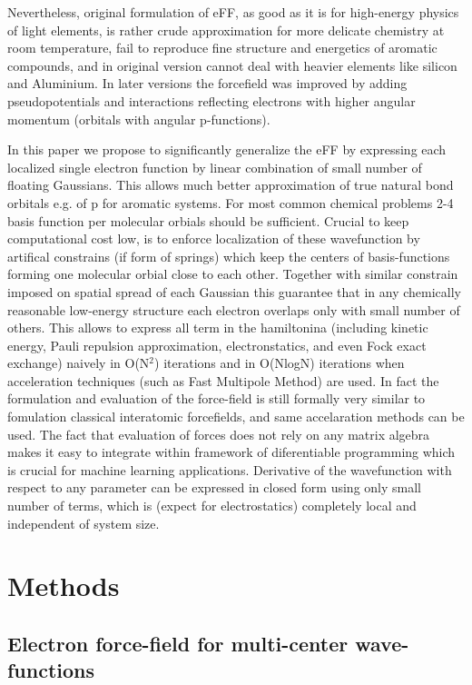 \documentclass[%
 reprint,
 amsmath,amssymb,
prb,
]{revtex4-1}
\begin{document}
Nevertheless, original formulation of eFF, as good as it is for high-energy physics of light elements, is rather crude approximation for more delicate chemistry at room temperature, fail to reproduce fine structure and energetics of aromatic compounds, and in original version cannot deal with heavier elements  like silicon and Aluminium. In later versions the forcefield was improved by adding pseudopotentials and interactions reflecting electrons with higher angular momentum (orbitals with angular p-functions).

In this paper we propose to significantly generalize the eFF by expressing each localized single electron function by linear combination of small number of floating Gaussians. This allows much better approximation of true natural bond orbitals e.g. of p for aromatic systems. For most common chemical problems 2-4 basis function per molecular orbials should be sufficient. Crucial to keep computational cost low, is to enforce localization of these wavefunction by artifical constrains (if form of springs) which keep the centers of basis-functions forming one molecular orbial close to each other. Together with similar constrain imposed on spatial spread of each Gaussian this guarantee that in any chemically reasonable low-energy structure each electron overlaps only with small number of others. This allows to express all term in the hamiltonina (including kinetic energy, Pauli repulsion approximation, electronstatics, and even Fock exact exchange) naively in O(N$^2$) iterations and in O(NlogN) iterations when acceleration techniques (such as Fast Multipole Method) are used. In fact the formulation and evaluation of the force-field is still formally very similar to fomulation classical interatomic forcefields, and same accelaration methods can be used. The fact that evaluation of forces does not rely on any matrix algebra makes it easy to integrate within framework of diferentiable programming which is crucial for machine learning applications. Derivative of the wavefunction with respect to any parameter can be expressed in closed form using only small number of terms, which is (expect for electrostatics) completely local and independent of system size. 

\section{Methods}

\subsection{Electron force-field for multi-center wave-functions}
\end{document}
